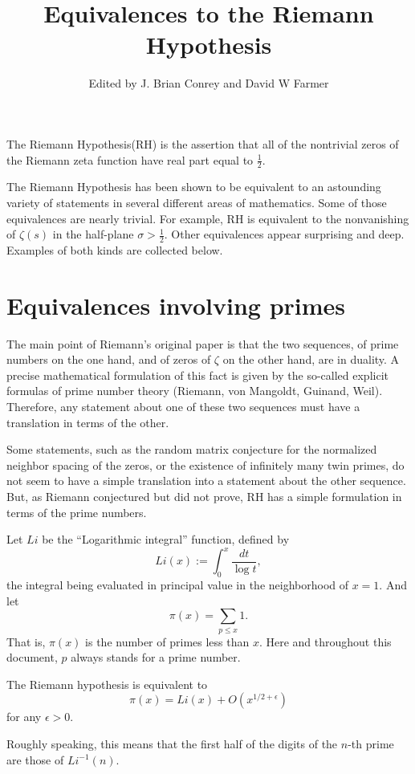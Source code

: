 \documentclass[12pt,letterpaper, reqno]{amsart}
\begin{document}
\title{Equivalences to the Riemann Hypothesis}
\author{Edited by J. Brian Conrey and David W Farmer}


\maketitle

The Riemann Hypothesis(RH)
is the assertion that all of the nontrivial zeros of the Riemann
zeta function have real part equal to $\frac12$.

The Riemann Hypothesis has been shown to be equivalent to an
astounding variety of statements in several different areas
of mathematics.  Some of those equivalences are nearly trivial.
For example, RH is equivalent to the nonvanishing of $\zeta(s)$ in the
half-plane $\sigma>\frac12$.  Other equivalences appear surprising
and deep.  Examples of both kinds are collected below.

\section{Equivalences involving primes}

The main point of Riemann's original paper
is that the two sequences, of prime numbers on the one hand, and of zeros
of $\zeta$ on the other hand, are in duality. A precise mathematical
formulation of this fact is given by the so-called explicit formulas of
prime number theory (Riemann, von Mangoldt, Guinand, Weil). Therefore,
any statement about one of these two sequences must have a translation
in terms of the other.

Some statements, such as the random matrix conjecture for the
normalized neighbor spacing of the zeros,
or the existence of infinitely many twin primes, do not seem
to have a simple translation into a statement about the other
sequence.
But, as Riemann conjectured but did not prove, RH has a
simple formulation in terms of the prime numbers.

Let $Li$ be the ``Logarithmic integral'' function, defined by
$$
Li(x) := \int_0^x \frac{dt}{\log t},
$$
the integral being evaluated in principal value in the neighborhood of $x=1$.
And let
$$
\pi(x) = \sum_{p \le x} 1.
$$
That is, $\pi(x)$ is the number of primes less than $x$.
Here and throughout this document, $p$ always stands for a prime number.

\begin{problemblock}
\begin{rhequivalence}[1.1] 
The Riemann hypothesis is equivalent to
$$
\pi(x) = Li(x) + O(x^{1/2 + \epsilon})
$$
for any $\epsilon > 0$.
\end{rhequivalence}

\begin{distinguishedremark}
Roughly speaking, this means that the first half of the digits of the
$n$-th prime are those of $Li^{-1}(n)$.
\end{distinguishedremark}
\end{problemblock}
\end{document}
